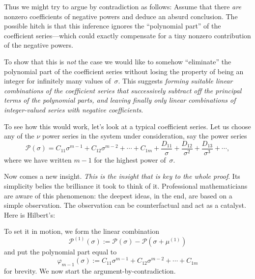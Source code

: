 \documentclass{article}
\theoremstyle{plain}
\theoremstyle{definition}
\begin{document}
Thus we might try to argue by contradiction as follows: Assume that
there \emph{are} nonzero coefficients of negative powers and deduce an
absurd conclusion. The possible hitch is that this inference ignores
the ``polynomial part'' of the coefficient series---which could
exactly compensate for a tiny nonzero contribution of the negative
powers.

To show that this is \emph{not} the case we would like to somehow
``eliminate'' the polynomial part of the coefficient series without
losing the property of being an integer for infinitely many values
of~$\sigma$. This suggests \emph{forming suitable linear combinations
of the coefficient series that successively subtract off the
principal terms of the polynomial parts, and leaving finally only
linear combinations of integer-valued series with negative
coefficients}.

To see how this would work, let's look at a typical coefficient
series. Let us choose any of the $\nu$ power series in the system
under consideration, say the power series
\[
\mathcal{P}(\sigma) 
= C_{11}\sigma^{m-1} + C_{12}\sigma^{m-2} +\cdots+ C_{1m} 
+ \frac{D_{11}}{\sigma} + \frac{D_{12}}{\sigma^2} 
+ \frac{D_{13}}{\sigma^3} + \cdots ,
\]
where we have written $m - 1$ for the highest power of~$\sigma$.  

Now comes a new insight. \emph{This is the insight that is key to the
whole proof}. Its simplicity belies the brilliance it took to think of
it. Professional mathematicians are aware of this phenomenon: the
deepest ideas, in the end, are based on a simple observation. The observation can be counterfactual and act as a catalyst.  Here is
Hilbert's: 

\begin{center}
\end{center}

\noindent
To set it in motion, we form the linear combination
\[
\mathcal{P}^{(1)}(\sigma) 
:= \mathcal{P}(\sigma) - \mathcal{P}(\sigma + \mu^{(1)})
\]
and put the polynomial part equal to
\[
\varphi_{m-1}(\sigma) 
:= C_{11}\sigma^{m-1} + C_{12}\sigma^{m-2} +\cdots+ C_{1m}
\]
for brevity. We now start the argument-by-contradiction.
\end{document}
